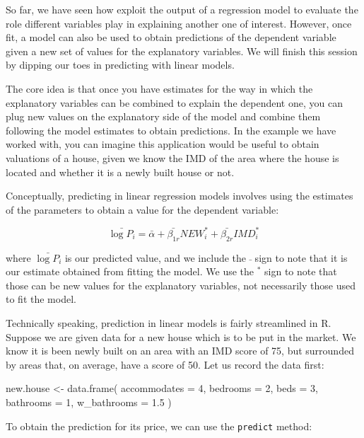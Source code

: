 \documentclass[
]{book}
\newenvironment{Shaded}{\begin{snugshade}}{\end{snugshade}}
\newcommand{\AttributeTok}[1]{\textcolor[rgb]{0.77,0.63,0.00}{#1}}
\newcommand{\DecValTok}[1]{\textcolor[rgb]{0.00,0.00,0.81}{#1}}
\newcommand{\FloatTok}[1]{\textcolor[rgb]{0.00,0.00,0.81}{#1}}
\newcommand{\FunctionTok}[1]{\textcolor[rgb]{0.00,0.00,0.00}{#1}}
\newcommand{\NormalTok}[1]{#1}
\newcommand{\OtherTok}[1]{\textcolor[rgb]{0.56,0.35,0.01}{#1}}
\begin{document}
So far, we have seen how exploit the output of a regression model to evaluate the role different variables play in explaining another one of interest. However, once fit, a model can also be used to obtain predictions of the dependent variable given a new set of values for the explanatory variables. We will finish this session by dipping our toes in predicting with linear models.

The core idea is that once you have estimates for the way in which the explanatory variables can be combined to explain the dependent one, you can plug new values on the explanatory side of the model and combine them following the model estimates to obtain predictions. In the example we have worked with, you can imagine this application would be useful to obtain valuations of a house, given we know the IMD of the area where the house is located and whether it is a newly built house or not.

Conceptually, predicting in linear regression models involves using the estimates of the parameters to obtain a value for the dependent variable:

\[
\bar{\log{P_i}} = \bar{\alpha} + \bar{\beta_{1r}} NEW_i^* + \bar{\beta_{2r}} IMD_i^*
\]

where \(\bar{\log{P_i}}\) is our predicted value, and we include the \(\bar{}\) sign to note that it is our estimate obtained from fitting the model. We use the \(^*\) sign to note that those can be new values for the explanatory variables, not necessarily those used to fit the model.

Technically speaking, prediction in linear models is fairly streamlined in R. Suppose we are given data for a new house which is to be put in the market. We know it is been newly built on an area with an IMD score of 75, but surrounded by areas that, on average, have a score of 50. Let us record the data first:

\begin{Shaded}
\begin{Highlighting}[]
\NormalTok{new.house }\OtherTok{\textless{}{-}} \FunctionTok{data.frame}\NormalTok{(}
  \AttributeTok{accommodates =} \DecValTok{4}\NormalTok{, }
  \AttributeTok{bedrooms =} \DecValTok{2}\NormalTok{,}
  \AttributeTok{beds =} \DecValTok{3}\NormalTok{,}
  \AttributeTok{bathrooms =} \DecValTok{1}\NormalTok{,}
  \AttributeTok{w\_bathrooms =} \FloatTok{1.5}
\NormalTok{)}
\end{Highlighting}
\end{Shaded}

To obtain the prediction for its price, we can use the \texttt{predict} method:
\end{document}
